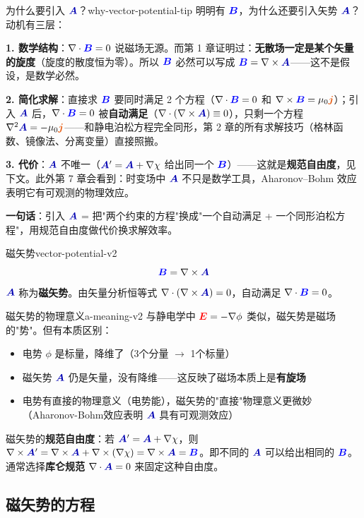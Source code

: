 \documentclass[11pt,a4paper,openany,oneside]{book}
\newcommand{\vecE}{\textcolor{red}{\vect{E}}}
\newcommand{\vecB}{\textcolor{blue}{\vect{B}}}
\newcommand{\vecJ}{\textcolor{cororange}{\vect{j}}}
\newcommand{\vecA}{\textcolor{blue!70!black}{\vect{A}}}
\newcommand{\muz}{\mu_0}
\newcommand{\vect}[1]{\bm{#1}}
\newcommand{\grad}{\nabla}
\newcommand{\curl}{\nabla\times}
\newcommand{\divg}{\nabla\cdot}
\newcommand{\lap}{\nabla^2}
\begin{document}
\begin{tip}{为什么要引入 $\vecA$？}{why-vector-potential-tip}
明明有 $\vecB$，为什么还要引入矢势 $\vecA$？动机有三层：

\textbf{1. 数学结构}：$\divg\vecB = 0$ 说磁场无源。而第 1 章证明过：\textbf{无散场一定是某个矢量的旋度}（旋度的散度恒为零）。所以 $\vecB$ 必然可以写成 $\vecB = \curl\vecA$——这不是假设，是数学必然。

\textbf{2. 简化求解}：直接求 $\vecB$ 要同时满足 2 个方程（$\divg\vecB=0$ 和 $\curl\vecB=\muz\vecJ$）；引入 $\vecA$ 后，$\divg\vecB=0$ 被\textbf{自动满足}（$\divg(\curl\vecA)\equiv 0$），只剩一个方程 $\lap\vecA = -\muz\vecJ$——和静电泊松方程完全同形，第 2 章的所有求解技巧（格林函数、镜像法、分离变量）直接照搬。

\textbf{3. 代价}：$\vecA$ 不唯一（$\vecA' = \vecA + \grad\chi$ 给出同一个 $\vecB$）——这就是\textbf{规范自由度}，见下文。此外第 7 章会看到：时变场中 $\vecA$ 不只是数学工具，Aharonov--Bohm 效应表明它有可观测的物理效应。

\textbf{一句话}：引入 $\vecA$ = 把"两个约束的方程"换成"一个自动满足 + 一个同形泊松方程"，用规范自由度做代价换求解效率。
\end{tip}

\begin{definition}{磁矢势}{vector-potential-v2}
\[
\vecB = \curl\vecA
\]
$\vecA$ 称为\textbf{磁矢势}。由矢量分析恒等式 $\divg(\curl\vecA) = 0$，自动满足 $\divg\vecB = 0$。
\end{definition}

\begin{insight}{磁矢势的物理意义}{a-meaning-v2}
与静电学中 $\vecE = -\grad\phi$ 类似，磁矢势是磁场的"势"。但有本质区别：
\begin{itemize}
\item 电势 $\phi$ 是标量，降维了（3个分量 $\to$ 1个标量）
\item 磁矢势 $\vecA$ 仍是矢量，没有降维——这反映了磁场本质上是\textbf{有旋场}
\item 电势有直接的物理意义（电势能），磁矢势的"直接"物理意义更微妙（Aharonov-Bohm效应表明 $\vecA$ 具有可观测效应）
\end{itemize}

磁矢势的\textbf{规范自由度}：若 $\vecA' = \vecA + \grad\chi$，则 $\curl\vecA' = \curl\vecA + \curl(\grad\chi) = \curl\vecA = \vecB$。即不同的 $\vecA$ 可以给出相同的 $\vecB$。通常选择\textbf{库仑规范} $\divg\vecA = 0$ 来固定这种自由度。
\end{insight}

\subsection{磁矢势的方程}
\end{document}
